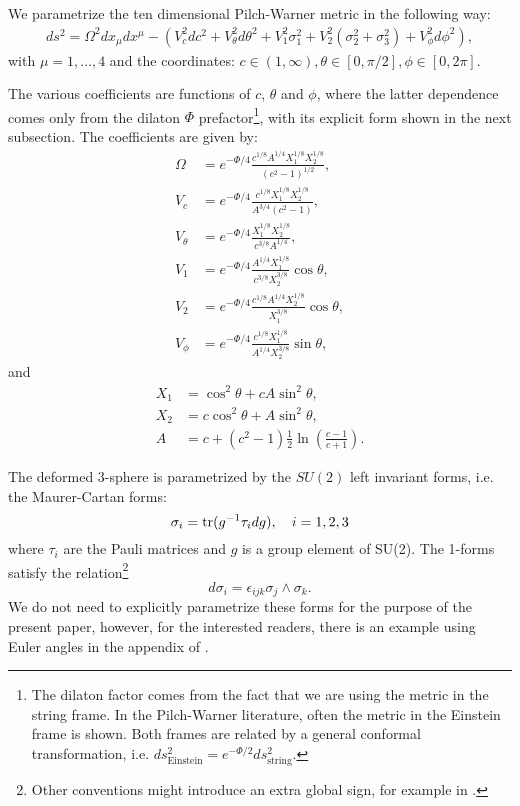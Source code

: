 We parametrize the ten dimensional Pilch-Warner metric in the following way:
\begin{align}\label{eq:PWmetric}
ds^2 =
\Omega^2 dx_\mu dx^\mu -\left(
V_c^2 dc^2 + V_\theta^2 d\theta^2 + V_1^2 \sigma_1^2 + V_2^2 (\sigma_2^2 + \sigma_3^2) + V_\phi^2 d\phi^2\right),
\end{align}
with $\mu=1,\ldots,4$ and the coordinates: $c\in(1, \infty), \theta \in [0, \pi/2], \phi \in [0, 2\pi]$. 

The various coefficients are functions of $c$, $\theta$ and $\phi$, where the latter dependence comes only from the dilaton $\Phi$ prefactor\footnote{The dilaton factor comes from the fact that we are using the metric in the string frame. In the Pilch-Warner literature, often the metric in the Einstein frame is shown. Both frames are related by a general conformal transformation, i.e. $ds^2_\text{Einstein} = e^{-\Phi / 2} ds^2_\text{string}$.}, with its explicit form shown in the next subsection. 
The coefficients are given by:
\begin{align}\label{eq:PWvielbeins}
\Omega &=e^{-\Phi/4} \frac{c^{1/8} A^{1/4} X_1^{1/8} X_2^{1/8}}{(c^2 - 1)^{1/2}},\nonumber\\
V_c &= e^{-\Phi/4}\frac{c^{1/8}X_1^{1/8} X_2^{1/8}}{A^{3/4} (c^2-1)},\nonumber\\
V_\theta &= e^{-\Phi/4}\frac{X_1^{1/8} X_2^{1/8}}{c^{3/8}A^{1/4}},\nonumber\\
V_1 &= e^{-\Phi/4}\frac{A^{1/4}X_1^{1/8} }{c^{3/8}X_2^{3/8}} \cos\theta,\nonumber\\
V_2 &= e^{-\Phi/4}\frac{c^{1/8}A^{1/4}X_2^{1/8} }{X_1^{3/8}} \cos\theta, \nonumber\\
V_\phi &= e^{-\Phi/4}\frac{c^{1/8}X_1^{1/8} }{A^{1/4}X_2^{3/8}} \sin\theta,
\end{align}
and
\begin{align}
X_1 &=  \cos^2\theta + cA  \sin^2\theta,\nonumber\\
X_2 &= c \cos^2\theta + A  \sin^2\theta, \nonumber\\
A &= c+(c^2 -1)\frac{1}{2}\ln\left(\frac{c-1}{c+1}\right).
\end{align}

The deformed 3-sphere is parametrized by the $SU(2)$ left invariant forms, i.e. the Maurer-Cartan forms:
\begin{equation}
\sigma_i = \mathop{\mathrm{tr}}(g^{-1}\tau_i d g), \quad i = 1,2,3
\end{equation}
where $\tau_i$ are the Pauli matrices and $g$ is a group element of SU(2). The 1-forms satisfy the relation\footnote{Other conventions might introduce an extra global sign, for example in \cite{Buchel:2000cn}.}
\begin{equation}
 d\sigma_i  = \epsilon_{i j k} \sigma_j \wedge \sigma_k.
\end{equation}
We do not need to explicitly parametrize these forms for the purpose of the present paper, however, for the interested readers, there is an example using Euler angles in the appendix of \cite{Chen-Lin:2015xlh}. 


